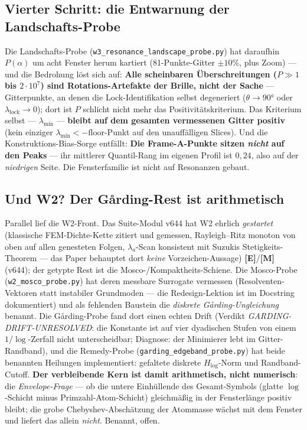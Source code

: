 \documentclass[11pt,a4paper]{article}
\newcommand{\E}{\textcolor{gut}{\textbf{[E]}}}
\newcommand{\M}{\textcolor{mess}{\textbf{[M]}}}
\begin{document}
\subsection*{Vierter Schritt: die Entwarnung der Landschafts-Probe}

Die Landschafts-Probe (\texttt{w3\_resonance\_landscape\_probe.py})
hat daraufhin $P(\alpha)$ um acht Fenster herum kartiert (81-Punkte-Gitter
$\pm 10\%$, plus Zoom) --- und die Bedrohung löst sich auf:
\textbf{Alle scheinbaren Überschreitungen ($P \gg 1$ bis $2 \cdot
10^7$) sind Rotations-Artefakte der Brille, nicht der Sache} ---
Gitterpunkte, an denen die Lock-Identifikation selbst degeneriert
($\theta \to 90°$ oder $\lambda_{\mathrm{lock}} \to 0$); dort ist
$P$ schlicht nicht mehr das Positivitätskriterium. Das
Kriterium selbst --- $\lambda_{\min}$ --- \textbf{bleibt auf dem
gesamten vermessenen Gitter positiv} (kein einziger
$\lambda_{\min} < -\mathrm{floor}$-Punkt auf den unauffälligen
Slices). Und die Konstruktions-Bias-Sorge entfällt: \textbf{Die
Frame-A-Punkte sitzen \emph{nicht} auf den Peaks} --- ihr mittlerer
Quantil-Rang im eigenen Profil ist $0{,}24$, also auf der
\emph{niedrigen} Seite. Die Fensterfamilie ist nicht auf
Resonanzen gebaut.

\subsection*{Und W2? Der Gårding-Rest ist arithmetisch}

Parallel lief die W2-Front. Das Suite-Modul v644 hat W2 ehrlich
\emph{gestartet} (klassische FEM-Dichte-Kette zitiert und gemessen,
Rayleigh--Ritz monoton von oben auf allen genesteten Folgen,
$\lambda_a$-Scan konsistent mit Suzukis Stetigkeits-Theorem ---
das Paper behauptet dort \emph{keine} Vorzeichen-Aussage) \E{}/\M{}
(v644); der getypte Rest ist die Mosco-/Kompaktheits-Schiene. Die
Mosco-Probe (\texttt{w2\_mosco\_probe.py}) hat deren messbare
Surrogate vermessen (Resolventen-Vektoren statt instabiler
Grundmoden --- die Redesign-Lektion ist im Docstring dokumentiert)
und als fehlenden Baustein die \emph{diskrete
Gårding-Ungleichung} benannt. Die Gårding-Probe fand dort einen
echten Drift (Verdikt \emph{GARDING-DRIFT-UNRESOLVED}: die
Konstante ist auf vier dyadischen Stufen von einem
$1/\log$-Zerfall nicht unterscheidbar; Diagnose: der Minimierer
lebt im Gitter-Randband), und die Remedy-Probe
(\texttt{garding\_edgeband\_probe.py}) hat beide benannten
Heilungen implementiert: gefaltete diskrete $H_{\log}$-Norm und
Randband-Cutoff. \textbf{Der verbleibende Kern ist damit
arithmetisch, nicht numerisch}: die \emph{Envelope-Frage} --- ob
die untere Einhüllende des Gesamt-Symbols (glatte
$\log$-Schicht minus Primzahl-Atom-Schicht) gleichmäßig in der
Fensterlänge positiv bleibt; die grobe Chebyshev-Abschätzung der
Atommasse wächst mit dem Fenster und liefert das allein
\emph{nicht}. Benannt, offen.
\end{document}

